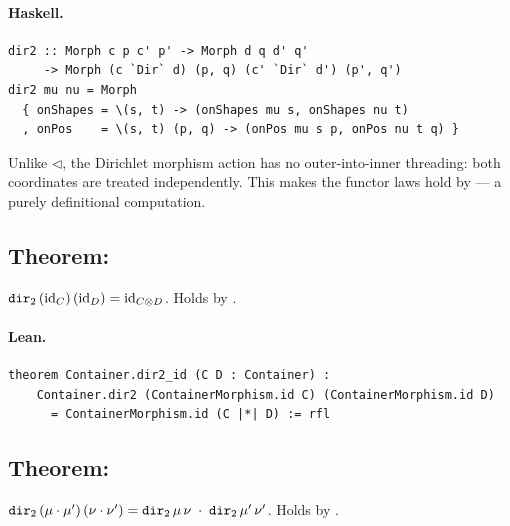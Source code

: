 \documentclass[11pt,a4paper]{article}
\begin{document}
\paragraph{Haskell.}
\begin{lstlisting}[style=haskell]
dir2 :: Morph c p c' p' -> Morph d q d' q'
     -> Morph (c `Dir` d) (p, q) (c' `Dir` d') (p', q')
dir2 mu nu = Morph
  { onShapes = \(s, t) -> (onShapes mu s, onShapes nu t)
  , onPos    = \(s, t) (p, q) -> (onPos mu s p, onPos nu t q) }
\end{lstlisting}

\begin{fidelitynote}
Unlike $\triangleleft$, the Dirichlet morphism action has no outer-into-inner
threading: both coordinates are treated independently.  This makes the functor
laws hold by  --- a purely definitional computation.
\end{fidelitynote}


\subsection{Theorem: }

\begin{thm}
$\texttt{dir}_2\,(\mathrm{id}_C)\,(\mathrm{id}_D) = \mathrm{id}_{C \otimes D}$.
Holds by .
\end{thm}

\paragraph{Lean.}
\begin{lstlisting}[style=lean]
theorem Container.dir2_id (C D : Container) :
    Container.dir2 (ContainerMorphism.id C) (ContainerMorphism.id D)
      = ContainerMorphism.id (C |*| D) := rfl
\end{lstlisting}


\subsection{Theorem: }

\begin{thm}
$\texttt{dir}_2\,(\mu \cdot \mu')\,(\nu \cdot \nu')
= \texttt{dir}_2\,\mu\,\nu \;\cdot\; \texttt{dir}_2\,\mu'\,\nu'$.
Holds by .
\end{thm}
\end{document}
